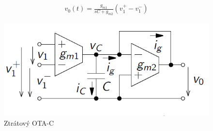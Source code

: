 \documentclass[twoside]{article}
\begin{document}
\begin{align}
v_0(t) = \frac{g_{m1}}{sC + g_{m2}}(v_1^+ - v_{1}^-)
\end{align}
\begin{figure}[H]
\centering
\includegraphics[scale=0.5]{damp.png}
\caption{Ztrátový OTA-C \cite{4}}
\end{figure}
\end{document}
